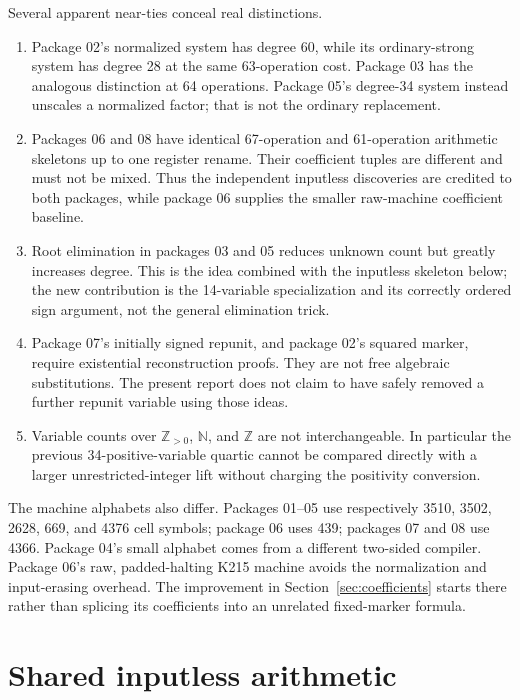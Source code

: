 \documentclass[11pt]{article}
\newcommand{\N}{\mathbb N}
\newcommand{\Z}{\mathbb Z}
\newcommand{\Pos}{\mathbb Z_{>0}}
\begin{document}
Several apparent near-ties conceal real distinctions.
\begin{enumerate}
\item Package 02's normalized system has degree 60, while its ordinary-strong system has degree 28 at the same 63-operation cost. Package 03 has the analogous distinction at 64 operations. Package 05's degree-34 system instead unscales a normalized factor; that is not the ordinary replacement.
\item Packages 06 and 08 have identical 67-operation and 61-operation arithmetic skeletons up to one register rename. Their coefficient tuples are different and must not be mixed. Thus the independent inputless discoveries are credited to both packages, while package 06 supplies the smaller raw-machine coefficient baseline.
\item Root elimination in packages 03 and 05 reduces unknown count but greatly increases degree. This is the idea combined with the inputless skeleton below; the new contribution is the 14-variable specialization and its correctly ordered sign argument, not the general elimination trick.
\item Package 07's initially signed repunit, and package 02's squared marker, require existential reconstruction proofs. They are not free algebraic substitutions. The present report does not claim to have safely removed a further repunit variable using those ideas.
\item Variable counts over $\Pos$, $\N$, and $\Z$ are not interchangeable. In particular the previous 34-positive-variable quartic cannot be compared directly with a larger unrestricted-integer lift without charging the positivity conversion.
\end{enumerate}

The machine alphabets also differ. Packages 01--05 use respectively 3510, 3502, 2628, 669, and 4376 cell symbols; package 06 uses 439; packages 07 and 08 use 4366. Package 04's small alphabet comes from a different two-sided compiler. Package 06's raw, padded-halting K215 machine avoids the normalization and input-erasing overhead. The improvement in Section~\ref{sec:coefficients} starts there rather than splicing its coefficients into an unrelated fixed-marker formula.

\section{Shared inputless arithmetic}\label{sec:shared}
\end{document}
